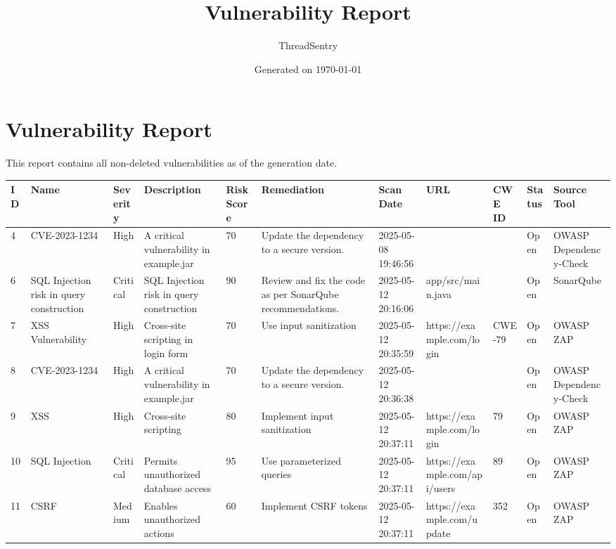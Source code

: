 \documentclass[a4paper,10pt]{article}
\title{Vulnerability Report}
\author{ThreadSentry}
\date{Generated on \today}
\begin{document}
\maketitle

\section*{Vulnerability Report}
This report contains all non-deleted vulnerabilities as of the generation date.

\begin{longtable}{|>{\raggedright}p{0.5cm}|>{\raggedright}p{2cm}|>{\raggedright}p{1.5cm}|>{\raggedright}p{3cm}|>{\raggedright}p{1cm}|>{\raggedright}p{2cm}|>{\raggedright}p{2cm}|>{\raggedright}p{2cm}|>{\raggedright}p{1cm}|>{\raggedright}p{1cm}|>{\raggedright}p{2cm}|}
\hline
\rowcolor{headergray}
\textbf{ID} & \textbf{Name} & \textbf{Severity} & \textbf{Description} & \textbf{Risk Score} & \textbf{Remediation} & \textbf{Scan Date} & \textbf{URL} & \textbf{CWE ID} & \textbf{Status} & \textbf{Source Tool} \\
\hline
\endhead
4 & CVE-2023-1234 & High & A critical vulnerability in example.jar & 70 & Update the dependency to a secure version. & 2025-05-08 19:46:56 &  &  & Open & OWASP Dependency-Check \\
\hline
6 & SQL Injection risk in query construction & Critical & SQL Injection risk in query construction & 90 & Review and fix the code as per SonarQube recommendations. & 2025-05-12 20:16:06 & app/src/main.java &  & Open & SonarQube \\
\hline
7 & XSS Vulnerability & High & Cross-site scripting in login form & 70 & Use input sanitization & 2025-05-12 20:35:59 & https://example.com/login & CWE-79 & Open & OWASP ZAP \\
\hline
8 & CVE-2023-1234 & High & A critical vulnerability in example.jar & 70 & Update the dependency to a secure version. & 2025-05-12 20:36:38 &  &  & Open & OWASP Dependency-Check \\
\hline
9 & XSS & High & Cross-site scripting & 80 & Implement input sanitization & 2025-05-12 20:37:11 & https://example.com/login & 79 & Open & OWASP ZAP \\
\hline
10 & SQL Injection & Critical & Permits unauthorized database access & 95 & Use parameterized queries & 2025-05-12 20:37:11 & https://example.com/api/users & 89 & Open & OWASP ZAP \\
\hline
11 & CSRF & Medium & Enables unauthorized actions & 60 & Implement CSRF tokens & 2025-05-12 20:37:11 & https://example.com/update & 352 & Open & OWASP ZAP \\

\end{longtable}
\end{document}

